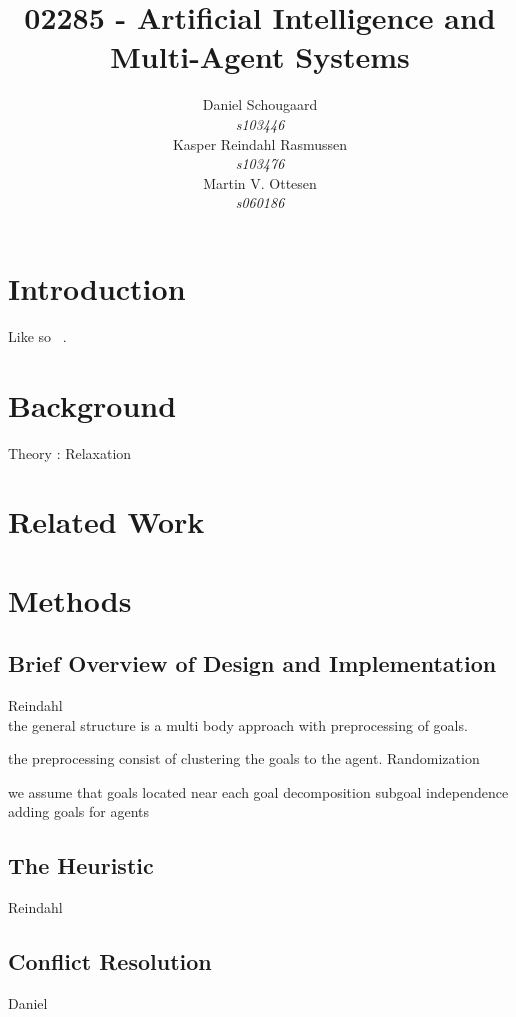 \documentclass[10pt,a4paper]{article}
\author{
    Daniel Schougaard \\ \textit{s103446} \\
    Kasper Reindahl Rasmussen\\ \textit{s103476}\\ 
    Martin V. Ottesen\\ \textit{s060186} 
}
\title{ 
    \Huge{02285 - Artificial Intelligence and Multi-Agent Systems}
}
\begin{document}



\clearpage\maketitle
\thispagestyle{empty}
\pagebreak
\pagestyle{plain}
\tableofcontents
\pagebreak


\section{Introduction}
	Like so ~\cite{book2015}. 
\section{Background}
	Theory : Relaxation

\section{Related Work}

\section{Methods}
	\subsection{Brief Overview of Design and Implementation}
		Reindahl\\
		the general structure is a multi body approach with preprocessing of goals.
		
		the preprocessing consist of clustering the goals to the agent.
			Randomization
		
		we assume that goals located near each 
		goal decomposition 
			subgoal independence
			adding goals for agents
		
		
	\subsection{The Heuristic}
		Reindahl \\
	\subsection{Conflict Resolution}
		Daniel
\end{document}
